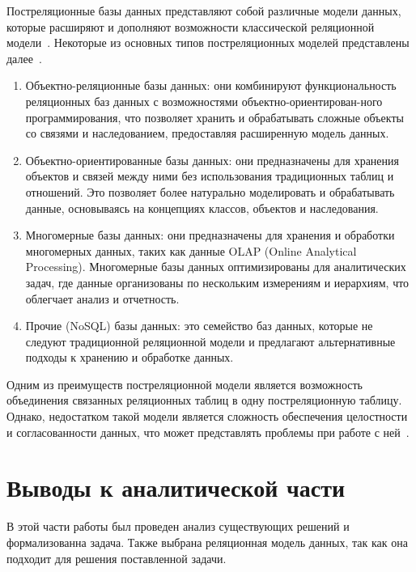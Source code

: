 Постреляционные базы данных представляют собой различные модели данных, которые расширяют и дополняют возможности классической реляционной модели~\cite{post}. 
Некоторые из основных типов постреляционных моделей представлены далее~\cite{ucheb}.
\begin{enumerate}[label=\arabic*)]
	\item Объектно-реляционные базы данных: они комбинируют функциональность реляционных баз данных с возможностями объектно-ориентирован-ного программирования, что позволяет хранить и обрабатывать сложные объекты со связями и наследованием, предоставляя расширенную модель данных.
	\item Объектно-ориентированные базы данных: они предназначены для хранения объектов и связей между ними без использования традиционных таблиц и отношений. Это позволяет более натурально моделировать и обрабатывать данные, основываясь на концепциях классов, объектов и наследования.
	\item Многомерные базы данных: они предназначены для хранения и обработки многомерных данных, таких как данные OLAP (Online Analytical Processing). Многомерные базы данных оптимизированы для аналитических задач, где данные организованы по нескольким измерениям и иерархиям, что облегчает анализ и отчетность.
	\item Прочие (NoSQL) базы данных: это семейство баз данных, которые не следуют традиционной реляционной модели и предлагают альтернативные подходы к хранению и обработке данных. 
\end{enumerate}

Одним из преимуществ постреляционной модели является возможность объединения связанных реляционных таблиц в одну постреляционную таблицу. Однако, недостатком такой модели является сложность обеспечения целостности и согласованности данных, что может представлять проблемы при работе с ней~\cite{post}.

\clearpage
\section*{Выводы к аналитической части}

В этой части работы был проведен анализ существующих решений и формализованна задача.
Также выбрана реляционная модель данных, так как она подходит для решения поставленной задачи.

